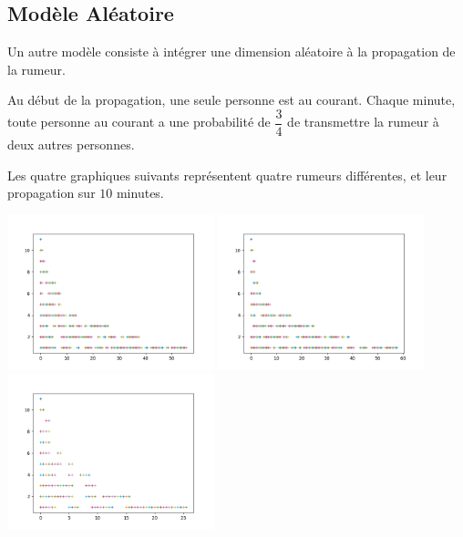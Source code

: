 \documentclass{exam}
\begin{document}
\begin{questions}
\section{Modèle Aléatoire}
\question Un autre modèle consiste à intégrer une dimension aléatoire à la propagation de la rumeur.
\begin{tcolorbox}
Au début de la propagation, une seule personne est au courant.
Chaque minute, toute personne au courant a une probabilité de $\dfrac{3}{4}$ de transmettre la rumeur à deux autres personnes.
\end{tcolorbox}
Les quatre graphiques suivants représentent quatre rumeurs différentes, et leur propagation sur $10$ minutes.
\begin{center}
\includegraphics[width=0.45\textwidth]{ModeleAleatoire1.png}
\includegraphics[width=0.45\textwidth]{ModeleAleatoire2.png}
\includegraphics[width=0.45\textwidth]{ModeleAleatoire3.png}

\end{center}
\end{questions}
\end{document}
